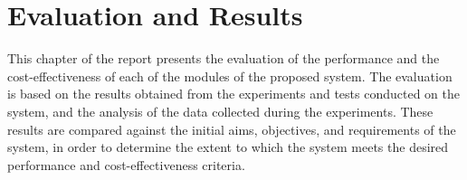 \chapter{Evaluation and Results}
\label{ch:evaluation}

This chapter of the report presents the evaluation of the performance and the cost-effectiveness of each of the modules of the proposed system.
The evaluation is based on the results obtained from the experiments and tests conducted on the system, and the analysis of the data collected during the experiments.
These results are compared against the initial aims, objectives, and requirements of the system, in order to determine the extent to which the system meets the desired performance and cost-effectiveness criteria.








